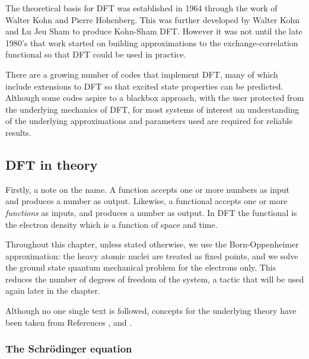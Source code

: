 The theoretical basis for DFT was established in 1964 through the work of Walter Kohn and Pierre Hohenberg.\autocite{Hohenberg1964} This was further developed by Walter Kohn and Lu Jeu Sham to produce Kohn-Sham DFT.\autocite{Kohn1965} However it was not until the late 1980's that work started on building approximations to the exchange-correlation functional so that DFT could be used in practice. 

There are a growing number of codes that implement DFT, many of which include extensions to DFT so that excited state properties can be predicted.
Although some codes aspire to a blackbox approach, with the user protected from the underlying mechanics of DFT, for most systems of interest an understanding of the underlying approximations and parameters used are required for reliable results.

\subsection{DFT in theory} %

Firstly, a note on the name. A function accepts one or more numbers as input and produces a number as output. Likewise, a functional accepts one or more \textit{functions} as inputs, and produces a number as output. In DFT the functional is the electron density which is a function of space and time.

Throughout this chapter, unless stated otherwise, we use the Born-Oppenheimer approximation: the heavy atomic nuclei are treated as fixed points, and we solve the ground state quantum mechanical problem for the electrons only. This reduces the number of degrees of freedom of the system, a tactic that will be used again later in the chapter.

Although no one single text is followed, concepts for the underlying theory have been taken from References \cite{Burke2007}, \cite{Scuseria05} and \cite{Perdew2010}.


\subsubsection{The Schr\"{o}dinger equation}

